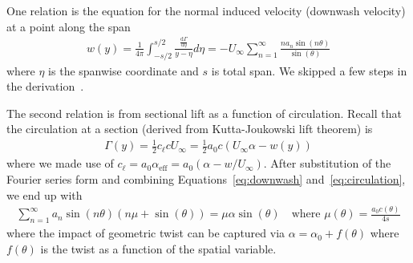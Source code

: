 \documentclass[10pt]{article}
\newcommand{\dd}[2]{\frac{\textrm{d} #1}{\textrm{d} #2}}
\newcommand{\half}{\frac{1}{2}}
\newcommand{\be}{\begin{eqnarray}}
\newcommand{\ee}{\end{eqnarray}}
\newcommand{\Uinf}{U_{\infty}}
\newcommand{\tn}[1]{\textrm{#1}}
\begin{document}
One relation is the equation for the normal induced velocity (downwash velocity) at a point along the span
\be
\label{eq:downwash}
w(y) = \frac{1}{4\pi}
\int_{-s/2}^{s/2} \frac{\dd{\Gamma}{\eta} }{y - \eta} d\eta
=
\boxed{
	-\Uinf \sum_{n=1}^{\infty} \frac{n a_n \sin \left( n \theta \right)}{\sin(\theta)}
}
\ee
where $\eta$ is the spanwise coordinate and $s$ is total span.
We skipped a few steps in the derivation~\cite[Sec.~3.7]{Kerwin2010}.

The second relation is from sectional lift as a function of circulation.
Recall that the circulation at a section (derived from Kutta-Joukowski lift theorem) is
\be
\label{eq:circulation}
\Gamma(y) = \half c_\ell c \Uinf
=\half a_0 c \left(\Uinf \alpha - w(y)\right)
\ee
where we made use of $c_\ell = a_0 \alpha_{\tn{eff}} = a_0 \left(\alpha - w/\Uinf\right)$.
After substitution of the Fourier series form and combining Equations~\eqref{eq:downwash} and~\eqref{eq:circulation}, we end up with
\be
\label{eq:circulation2}
\sum_{n=1}^{\infty} a_n \sin(n\theta) \left(n\mu + \sin(\theta)\right)
=
\mu \alpha \sin(\theta)
\quad \tn{where }\mu(\theta) = \frac{a_0 c(\theta)}{ 4 s}
\ee
where the impact of geometric twist can be captured via $\alpha = \alpha_0 + f(\theta)$ where $f(\theta)$ is the twist as a function of the spatial variable.
\end{document}
